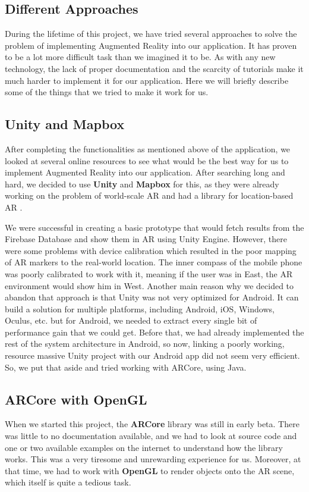 \subsection{Different Approaches}
During the lifetime of this project, we have tried several approaches to solve the problem of implementing Augmented Reality into our application. It has proven to be a lot more difficult task than we imagined it to be. As with any new technology, the lack of proper documentation and the scarcity of tutorials make it much harder to implement it for our application. Here we will briefly describe some of the things that we tried to make it work for us.

\subsection{Unity and Mapbox}
After completing the functionalities as mentioned above of the application, we looked at several online resources to see what would be the best way for us to implement Augmented Reality into our application. After searching long and hard, we decided to use \textbf{Unity} and \textbf{Mapbox} for this, as they were already working on the problem of world-scale AR and had a library for location-based AR \cite{MapboxUnitySDK2018}. 

We were successful in creating a basic prototype that would fetch results from the Firebase Database and show them in AR using Unity Engine. However, there were some problems with device calibration which resulted in the poor mapping of AR markers to the real-world location. The inner compass of the mobile phone was poorly calibrated to work with it, meaning if the user was in East, the AR environment would show him in West. Another main reason why we decided to abandon that approach is that Unity was not very optimized for Android. It can build a solution for multiple platforms, including Android, iOS, Windows, Oculus, etc. but for Android, we needed to extract every single bit of performance gain that we could get. Before that, we had already implemented the rest of the system architecture in Android, so now, linking a poorly working, resource massive Unity project with our Android app did not seem very efficient. So, we put that aside and tried working with ARCore, using Java.

\subsection{ARCore with OpenGL}
When we started this project, the \textbf{ARCore} library was still in early beta. There was little to no documentation available, and we had to look at source code and one or two available examples on the internet to understand how the library works. This was a very tiresome and unrewarding experience for us. Moreover, at that time, we had to work with \textbf{OpenGL} to render objects onto the AR scene, which itself is quite a tedious task.


